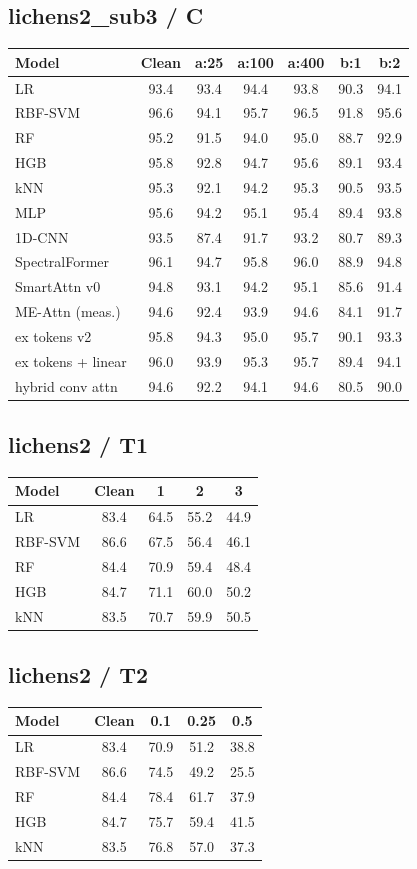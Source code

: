 \subsection*{lichens2\_sub3 / C}
\small
\begin{tabular}{lcccccc}
\toprule
Model & Clean & a:25 & a:100 & a:400 & b:1 & b:2 \\
\midrule
LR & 93.4 & 93.4 & 94.4 & 93.8 & 90.3 & 94.1 \\
RBF-SVM & 96.6 & 94.1 & 95.7 & 96.5 & 91.8 & 95.6 \\
RF & 95.2 & 91.5 & 94.0 & 95.0 & 88.7 & 92.9 \\
HGB & 95.8 & 92.8 & 94.7 & 95.6 & 89.1 & 93.4 \\
kNN & 95.3 & 92.1 & 94.2 & 95.3 & 90.5 & 93.5 \\
MLP & 95.6 & 94.2 & 95.1 & 95.4 & 89.4 & 93.8 \\
1D-CNN & 93.5 & 87.4 & 91.7 & 93.2 & 80.7 & 89.3 \\
SpectralFormer & 96.1 & 94.7 & 95.8 & 96.0 & 88.9 & 94.8 \\
SmartAttn v0 & 94.8 & 93.1 & 94.2 & 95.1 & 85.6 & 91.4 \\
ME-Attn (meas.) & 94.6 & 92.4 & 93.9 & 94.6 & 84.1 & 91.7 \\
ex tokens v2 & 95.8 & 94.3 & 95.0 & 95.7 & 90.1 & 93.3 \\
ex tokens + linear & 96.0 & 93.9 & 95.3 & 95.7 & 89.4 & 94.1 \\
hybrid conv attn & 94.6 & 92.2 & 94.1 & 94.6 & 80.5 & 90.0 \\
\bottomrule
\end{tabular}

\subsection*{lichens2 / T1}
\small
\begin{tabular}{lcccc}
\toprule
Model & Clean & 1 & 2 & 3 \\
\midrule
LR & 83.4 & 64.5 & 55.2 & 44.9 \\
RBF-SVM & 86.6 & 67.5 & 56.4 & 46.1 \\
RF & 84.4 & 70.9 & 59.4 & 48.4 \\
HGB & 84.7 & 71.1 & 60.0 & 50.2 \\
kNN & 83.5 & 70.7 & 59.9 & 50.5 \\
\bottomrule
\end{tabular}

\subsection*{lichens2 / T2}
\small
\begin{tabular}{lcccc}
\toprule
Model & Clean & 0.1 & 0.25 & 0.5 \\
\midrule
LR & 83.4 & 70.9 & 51.2 & 38.8 \\
RBF-SVM & 86.6 & 74.5 & 49.2 & 25.5 \\
RF & 84.4 & 78.4 & 61.7 & 37.9 \\
HGB & 84.7 & 75.7 & 59.4 & 41.5 \\
kNN & 83.5 & 76.8 & 57.0 & 37.3 \\
\bottomrule
\end{tabular}

